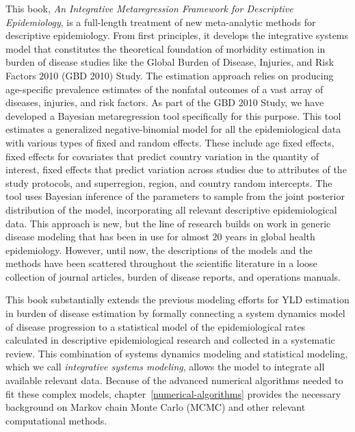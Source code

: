 This book, \emph{An Integrative Metaregression Framework for Descriptive
  Epidemiology}, is a full-length treatment of new meta-analytic
methods for descriptive epidemiology.  From first principles, it
develops the integrative systems model that constitutes the
theoretical foundation of morbidity estimation
in burden of disease studies like the Global Burden of Disease, Injuries, and Risk Factors 2010
 (GBD 2010) Study.  The estimation approach relies on producing
age-specific prevalence estimates of the nonfatal outcomes of a vast
array of diseases, injuries, and risk factors.  As part of the GBD
2010 Study, we have developed a Bayesian metaregression tool
specifically for this purpose. This tool estimates a generalized
negative-binomial model for all the epidemiological data with various
types of fixed and random effects.  These include age fixed effects,
fixed effects for covariates that predict country variation in the
quantity of interest, fixed effects that predict variation across
studies due to attributes of the study protocols, and superregion,
region, and country random intercepts.  The tool uses Bayesian
inference of the parameters to sample from the joint posterior
distribution of the model, incorporating all relevant descriptive
epidemiological data.  This approach is new, but the line of research
builds on work in generic disease modeling that has been in use for
almost $20$ years in global health
epidemiology.\cite{barendregt_generic_2003} However, until now, the
descriptions of the models and the methods have been scattered throughout
the scientific literature in a loose collection of journal articles,
burden of disease reports, and operations manuals.

This book substantially extends the previous modeling efforts for YLD
estimation in burden of disease estimation by formally connecting a
system dynamics model of disease progression to a statistical model of
the epidemiological rates calculated in descriptive
epidemiological research and collected in a systematic
review.  This combination of systems dynamics modeling and statistical
modeling, which we call
\emph{integrative systems modeling}, allows the model to integrate all
available relevant data.  Because of the advanced numerical algorithms needed to fit these complex models, chapter~\ref{numerical-algorithms} provides the
necessary background on Markov chain Monte Carlo (MCMC) and other
relevant computational methods.

